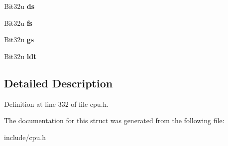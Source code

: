 \begin{DoxyCompactItemize}
\item 
\hypertarget{structTSS__32_a452bc114831435c75d740cf957f6f414}{Bit32u {\bfseries ds}}\label{structTSS__32_a452bc114831435c75d740cf957f6f414}

\item 
\hypertarget{structTSS__32_af8a7c7471dbd45b1d291387c506e8db9}{Bit32u {\bfseries fs}}\label{structTSS__32_af8a7c7471dbd45b1d291387c506e8db9}

\item 
\hypertarget{structTSS__32_a21cf303db8e7995ca443fd56b5a038d0}{Bit32u {\bfseries gs}}\label{structTSS__32_a21cf303db8e7995ca443fd56b5a038d0}

\item 
\hypertarget{structTSS__32_aaf2af37d72363e9b53627ad856942e39}{Bit32u {\bfseries ldt}}\label{structTSS__32_aaf2af37d72363e9b53627ad856942e39}

\end{DoxyCompactItemize}


\subsection{Detailed Description}


Definition at line 332 of file cpu.\-h.



The documentation for this struct was generated from the following file\-:\begin{DoxyCompactItemize}
\item 
include/cpu.\-h\end{DoxyCompactItemize}
